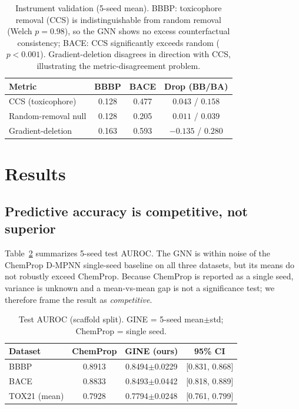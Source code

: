 \documentclass[a4paper,fleqn]{cas-dc}
\newcommand{\BBBPauc}{0.8494}
\newcommand{\BBBPaucsd}{0.0229}
\newcommand{\BACEauc}{0.8493}
\newcommand{\BACEaucsd}{0.0442}
\newcommand{\TOXauc}{0.7794}
\newcommand{\TOXaucsd}{0.0248}
\newcommand{\ChemBBBP}{0.8913}
\newcommand{\ChemBACE}{0.8833}
\newcommand{\ChemTOX}{0.7928}
\begin{document}
\begin{table}[t]
\centering
\caption{Instrument validation (5-seed mean). BBBP: toxicophore removal (CCS) is indistinguishable from random removal (Welch $p=0.98$), so the GNN shows no excess counterfactual consistency; BACE: CCS significantly exceeds random ($p<0.001$). Gradient-deletion disagrees in direction with CCS, illustrating the metric-disagreement problem.}
\label{tab:validate}
\begin{tabular}{@{}l c c c@{}}
\toprule
Metric & BBBP & BACE & Drop (BB/BA) \\
\midrule
CCS (toxicophore) & 0.128 & 0.477 & $0.043$ / $0.158$ \\
Random-removal null & 0.128 & 0.205 & $0.011$ / $0.039$ \\
Gradient-deletion & 0.163 & 0.593 & $-0.135$ / $0.280$ \\
\bottomrule
\end{tabular}
\end{table}

\section{Results}
\subsection{Predictive accuracy is competitive, not superior}
Table~\ref{tab:auroc} summarizes 5-seed test AUROC. The GNN is within noise of the ChemProp D-MPNN single-seed baseline on all three datasets, but its means do not robustly exceed ChemProp. Because ChemProp is reported as a single seed, variance is unknown and a mean-vs-mean gap is not a significance test; we therefore frame the result as \emph{competitive}.

\begin{table}[t]
\centering
\caption{Test AUROC (scaffold split). GINE = 5-seed mean$\pm$std; ChemProp = single seed.}
\label{tab:auroc}
\begin{tabular}{@{}l c c c@{}}
\toprule
Dataset & ChemProp & GINE (ours) & 95\% CI \\
\midrule
BBBP & \ChemBBBP & \BBBPauc$\pm$\BBBPaucsd & [0.831, 0.868] \\
BACE & \ChemBACE & \BACEauc$\pm$\BACEaucsd & [0.818, 0.889] \\
TOX21 (mean) & \ChemTOX & \TOXauc$\pm$\TOXaucsd & [0.761, 0.799] \\
\bottomrule
\end{tabular}
\end{table}
\end{document}
